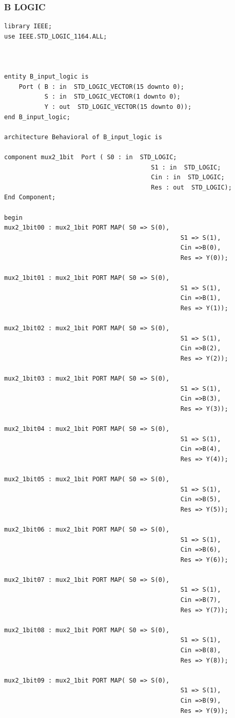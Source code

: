 \documentclass{article}
\begin{document}
\subsubsection{B LOGIC}\label{sec:result}

\begin{lstlisting}
library IEEE;
use IEEE.STD_LOGIC_1164.ALL;



entity B_input_logic is
    Port ( B : in  STD_LOGIC_VECTOR(15 downto 0);
           S : in  STD_LOGIC_VECTOR(1 downto 0);
           Y : out  STD_LOGIC_VECTOR(15 downto 0));
end B_input_logic;

architecture Behavioral of B_input_logic is

component mux2_1bit  Port ( S0 : in  STD_LOGIC;
										S1 : in  STD_LOGIC;
										Cin : in  STD_LOGIC;
										Res : out  STD_LOGIC);
End Component;

begin
mux2_1bit00 : mux2_1bit PORT MAP( S0 => S(0),
												S1 => S(1),
												Cin =>B(0),
												Res => Y(0));
					
mux2_1bit01 : mux2_1bit PORT MAP( S0 => S(0),
												S1 => S(1),
												Cin =>B(1),
												Res => Y(1));
												
mux2_1bit02 : mux2_1bit PORT MAP( S0 => S(0),
												S1 => S(1),
												Cin =>B(2),
												Res => Y(2));
					
mux2_1bit03 : mux2_1bit PORT MAP( S0 => S(0),
												S1 => S(1),
												Cin =>B(3),
												Res => Y(3));
												
mux2_1bit04 : mux2_1bit PORT MAP( S0 => S(0),
												S1 => S(1),
												Cin =>B(4),
												Res => Y(4));
					
mux2_1bit05 : mux2_1bit PORT MAP( S0 => S(0),
												S1 => S(1),
												Cin =>B(5),
												Res => Y(5));
												
mux2_1bit06 : mux2_1bit PORT MAP( S0 => S(0),
												S1 => S(1),
												Cin =>B(6),
												Res => Y(6));
					
mux2_1bit07 : mux2_1bit PORT MAP( S0 => S(0),
												S1 => S(1),
												Cin =>B(7),
												Res => Y(7));
												
mux2_1bit08 : mux2_1bit PORT MAP( S0 => S(0),
												S1 => S(1),
												Cin =>B(8),
												Res => Y(8));
					
mux2_1bit09 : mux2_1bit PORT MAP( S0 => S(0),
												S1 => S(1),
												Cin =>B(9),
												Res => Y(9));
												

\end{lstlisting}
\end{document}
